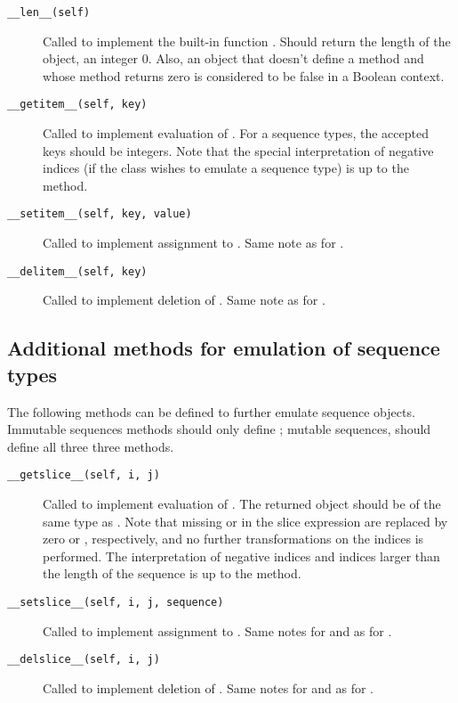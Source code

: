 \begin{description}

\item[{\tt __len__(self)}]
Called to implement the built-in function .  Should return
the length of the object, an integer \code{>=} 0.  Also, an object
that doesn't define a  method and
whose  method returns zero is considered to be false in a
Boolean context.

\item[{\tt __getitem__(self, key)}]
Called to implement evaluation of .
For a sequence types, the accepted keys should be integers.  Note that the
special interpretation of negative indices (if the class wishes to
emulate a sequence type) is up to the  method.

\item[{\tt __setitem__(self, key, value)}]
Called to implement assignment to .  Same note as for
.

\item[{\tt __delitem__(self, key)}]
Called to implement deletion of .  Same note as for
.

\end{description}


\subsection{Additional methods for emulation of sequence types}

The following methods can be defined to further emulate sequence
objects.  Immutable sequences methods should only define
; mutable sequences, should define all three
three methods.

\begin{description}

\item[{\tt __getslice__(self, i, j)}]
Called to implement evaluation of .  The returned
object should be of the same type as .  Note that missing
 or  in the slice expression are replaced by zero or
, respectively, and no further transformations on the
indices is performed.  The interpretation of negative indices and
indices larger than the length of the sequence is up to the method.

\item[{\tt __setslice__(self, i, j, sequence)}]
Called to implement assignment to .  Same notes for
 and  as for .

\item[{\tt __delslice__(self, i, j)}]
Called to implement deletion of .  Same notes for
 and  as for .

\end{description}

